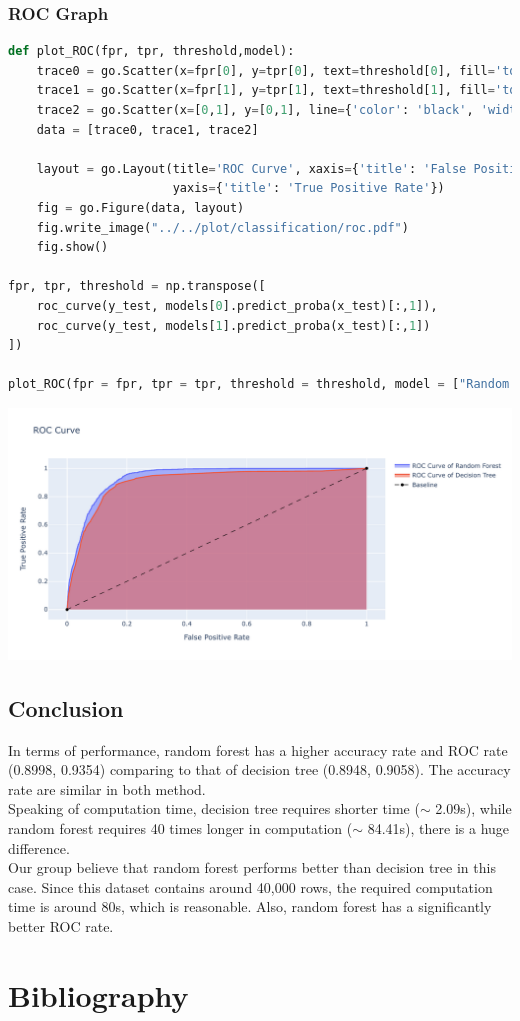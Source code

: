 \documentclass[11pt,a4paper]{article}
\begin{document}
    \subsubsection{ROC Graph}
\begin{lstlisting}[language = Python]
def plot_ROC(fpr, tpr, threshold,model):
    trace0 = go.Scatter(x=fpr[0], y=tpr[0], text=threshold[0], fill='tozeroy', name='ROC Curve of {} '.format(model[0]))
    trace1 = go.Scatter(x=fpr[1], y=tpr[1], text=threshold[1], fill='tozeroy', name='ROC Curve of {} '.format(model[1]))
    trace2 = go.Scatter(x=[0,1], y=[0,1], line={'color': 'black', 'width': 1, 'dash': 'dash'}, name='Baseline')
    data = [trace0, trace1, trace2]
    
    layout = go.Layout(title='ROC Curve', xaxis={'title': 'False Positive Rate'}, 
                       yaxis={'title': 'True Positive Rate'})
    fig = go.Figure(data, layout)
    fig.write_image("../../plot/classification/roc.pdf")
    fig.show()

fpr, tpr, threshold = np.transpose([
    roc_curve(y_test, models[0].predict_proba(x_test)[:,1]), 
    roc_curve(y_test, models[1].predict_proba(x_test)[:,1])
])

plot_ROC(fpr = fpr, tpr = tpr, threshold = threshold, model = ["Random Forest", "Decision Tree"])
\end{lstlisting}
    \noindent
    \begin{center}
        \includegraphics[width = 1 \textwidth]{plot/classification/roc.pdf}
    \end{center}
    
    
    \subsection{Conclusion}
    In terms of performance, random forest has a higher accuracy rate and ROC rate (0.8998, 0.9354) comparing to that of decision tree (0.8948, 0.9058). The accuracy rate are similar in both method. \\
    Speaking of computation time, decision tree requires shorter time ($\sim$ 2.09s), while random forest requires 40 times longer in computation ($\sim$ 84.41s), there is a huge difference. \\
    Our group believe that random forest performs better than decision tree in this case. Since this dataset contains around 40,000 rows, the required computation time is around 80s, which is reasonable. Also, random forest has a significantly better ROC rate.
    
    
    \newpage
    \section{Bibliography}
\end{document}
